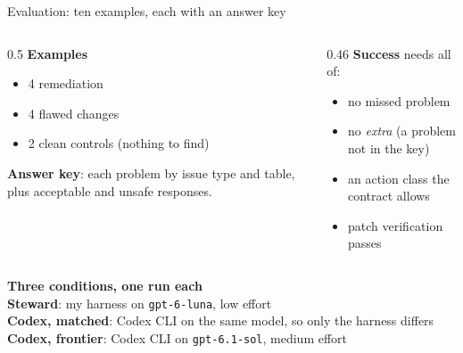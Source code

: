 \documentclass[aspectratio=169,11pt]{beamer}
\newcommand{\partlabel}{}
\newcommand{\setpart}[1]{\renewcommand{\partlabel}{#1}}
\begin{document}
\setpart{Part 2 \textbullet{} Evaluation}
\begin{frame}{Evaluation: ten examples, each with an answer key}
  \begin{columns}[T]
    \begin{column}{0.5\textwidth}
      \textbf{Examples}
      \begin{itemize}
        \item 4 remediation
        \item 4 flawed changes
        \item 2 clean controls (nothing to find)
      \end{itemize}
      \textbf{Answer key}: each problem by issue type and table, plus acceptable and unsafe responses.
    \end{column}
    \begin{column}{0.46\textwidth}
      \textbf{Success} needs all of:
      \begin{itemize}
        \item no missed problem
        \item no \emph{extra} (a problem not in the key)
        \item an action class the contract allows
        \item patch verification passes
      \end{itemize}
    \end{column}
  \end{columns}
  \vspace{0.2em}
  \begin{keybox}
    \textbf{Three conditions, one run each}\\[0.2em]
    \textbf{Steward}: my harness on \texttt{gpt-6-luna}, low effort\\
    \textbf{Codex, matched}: Codex CLI on the same model, so only the harness differs\\
    \textbf{Codex, frontier}: Codex CLI on \texttt{gpt-6.1-sol}, medium effort
  \end{keybox}
\end{frame}
\end{document}
